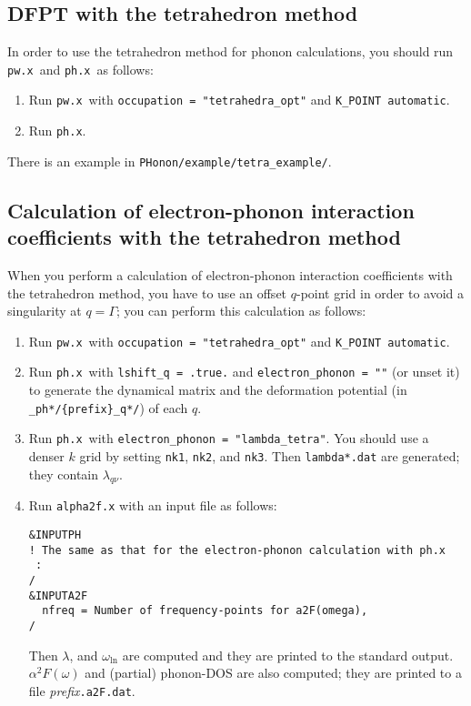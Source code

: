 \documentclass[12pt,a4paper]{article}
\def\pwx{\texttt{pw.x}}
\def\phx{\texttt{ph.x}}
\begin{document}
\subsection{DFPT with the tetrahedron method}

In order to use the tetrahedron method for phonon calculations,
you should run \pwx\ and \phx\ as follows:
\begin{enumerate}
  \item Run \pwx\ with \verb|occupation = "tetrahedra_opt"| and \verb|K_POINT automatic|.
  \item Run \phx.
\end{enumerate}

There is an example in \verb|PHonon/example/tetra_example/|.

\subsection{Calculation of electron-phonon interaction coefficients with the tetrahedron method}

When you perform a calculation of electron-phonon interaction coefficients 
with the tetrahedron method,
you have to use an offset $q$-point grid in order to avoid a singularity 
at $q=\Gamma$; you can perform this calculation as follows:

\begin{enumerate}
  \item Run \pwx\ with \verb|occupation = "tetrahedra_opt"| and \verb|K_POINT automatic|.
  \item Run \phx\ with \verb|lshift_q = .true.| and \verb|electron_phonon = ""| (or unset it)
    to generate the dynamical matrix and
    the deformation potential (in \verb|_ph*/{prefix}_q*/|) of each $q$.
  \item Run \phx\ with \verb|electron_phonon = "lambda_tetra"|.
    You should use a denser $k$ grid by setting \verb|nk1|, \verb|nk2|, and \verb|nk3|.
    Then \verb|lambda*.dat| are generated; they contain $\lambda_{q \nu}$.
  \item Run \verb|alpha2f.x| with an input file as follows:
\begin{verbatim}
&INPUTPH
! The same as that for the electron-phonon calculation with ph.x
 :
/
&INPUTA2F
  nfreq = Number of frequency-points for a2F(omega), 
/
\end{verbatim}
Then $\lambda$, and $\omega_{\ln}$ are computed and they are printed to the standard output.
$\alpha^2F(\omega)$ and (partial) phonon-DOS are also computed;
they are printed to a file \textit{prefix}\verb|.a2F.dat|.
\end{enumerate}
\end{document}
